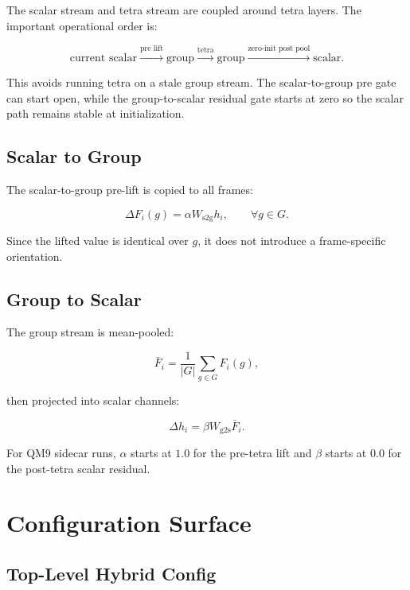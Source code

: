 \documentclass[11pt]{article}
\begin{document}
The scalar stream and tetra stream are coupled around tetra layers.  The
important operational order is:

\[
  \text{current scalar}
  \xrightarrow{\text{pre lift}}
  \text{group}
  \xrightarrow{\text{tetra}}
  \text{group}
  \xrightarrow{\text{zero-init post pool}}
  \text{scalar}.
\]

This avoids running tetra on a stale group stream.  The scalar-to-group pre
gate can start open, while the group-to-scalar residual gate starts at zero so
the scalar path remains stable at initialization.

\subsection{Scalar to Group}

The scalar-to-group pre-lift is copied to all frames:

\[
  \Delta F_i(g)
  =
  \alpha
  W_{\mathrm{s2g}}h_i,
  \qquad
  \forall g\in G.
\]

Since the lifted value is identical over \(g\), it does not introduce a
frame-specific orientation.

\subsection{Group to Scalar}

The group stream is mean-pooled:

\[
  \bar F_i
  =
  \frac{1}{|G|}
  \sum_{g\in G}F_i(g),
\]

then projected into scalar channels:

\[
  \Delta h_i
  =
  \beta
  W_{\mathrm{g2s}}\bar F_i.
\]

For QM9 sidecar runs, \(\alpha\) starts at \(1.0\) for the pre-tetra lift and
\(\beta\) starts at \(0.0\) for the post-tetra scalar residual.

\section{Configuration Surface}

\subsection{Top-Level Hybrid Config}
\end{document}

